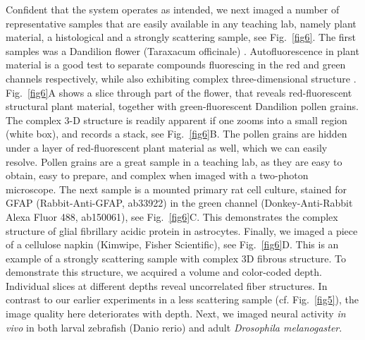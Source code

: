 \documentclass[10pt,letterpaper]{article}
\begin{document}
Confident that the system operates as intended, we next imaged a number of representative samples that are easily available in any teaching lab, namely plant material, a histological and a strongly scattering sample, see Fig.~\ref{fig6}. The first samples was a Dandilion flower (Taraxacum officinale) \cite{Rupprecht2018}. Autofluorescence in plant material is a good test to separate compounds fluorescing in the red and green channels respectively, while also exhibiting complex three-dimensional structure \cite{Cheung2010, Nguyen2001}. Fig.~\ref{fig6}A shows a slice through part of the flower, that reveals red-fluorescent structural plant material, together with green-fluorescent Dandilion pollen grains. The complex 3-D structure is readily apparent if one zooms into a small region (white box), and records a stack, see Fig.~\ref{fig6}B. The pollen grains are hidden under a layer of red-fluorescent plant material as well, which we can easily resolve. Pollen grains are a great sample in a teaching lab, as they are easy to obtain, easy to prepare, and complex when imaged with a two-photon microscope\cite{Rupprecht2018}. The next sample is a mounted primary rat cell culture\cite{Schottdorf2018}, stained for GFAP (Rabbit-Anti-GFAP, ab33922) in the green channel (Donkey-Anti-Rabbit Alexa Fluor 488, ab150061), see Fig.~\ref{fig6}C. This demonstrates the complex structure of glial fibrillary acidic protein in astrocytes. Finally, we imaged a piece of a cellulose napkin (Kimwipe, Fisher Scientific), see Fig.~\ref{fig6}D. This is an example of a strongly scattering sample with complex 3D fibrous structure. To demonstrate this structure, we acquired a volume and color-coded depth. Individual slices at different depths reveal uncorrelated fiber structures. In contrast to our earlier experiments in a less scattering sample (cf. Fig.~\ref{fig5}), the image quality here deteriorates with depth.\newline
Next, we imaged neural activity \textit{in vivo} in both larval zebrafish (Danio rerio) and adult \textit{Drosophila melanogaster}. 
%
\end{document}
